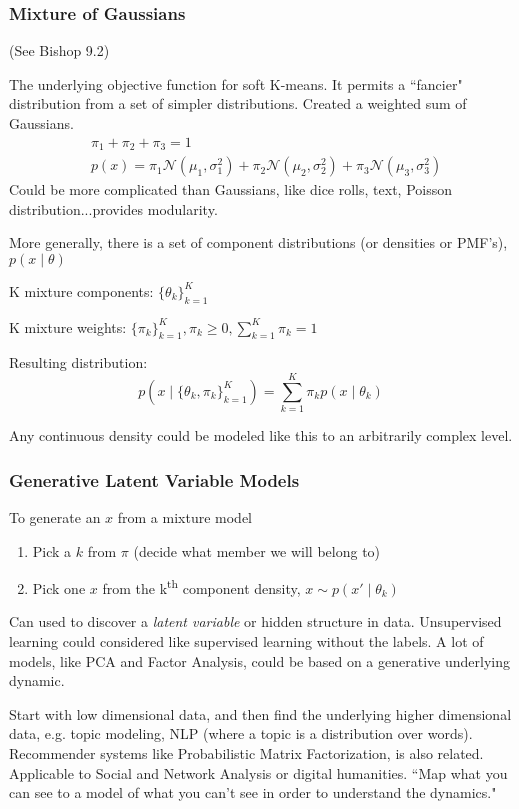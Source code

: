 \documentclass[11pt, oneside]{article}   	%
\begin{document}
\subsubsection{Mixture of Gaussians}

(See Bishop 9.2)

The underlying objective function for soft K-means. It permits a ``fancier" distribution from a set of simpler distributions. Created a weighted sum of Gaussians.
\begin{align}
&\pi_1 + \pi_2 + \pi_3 = 1\\
&p(x) = \pi_1 \mathcal{N}(\mu_1,\sigma_1^2) + \pi_2 \mathcal{N}(\mu_2,\sigma_2^2) + \pi_3 \mathcal{N}(\mu_3,\sigma_3^2)
\end{align}
Could be more complicated than Gaussians, like dice rolls, text, Poisson distribution...provides modularity.

More generally, there is a set of component distributions (or densities or PMF's),  \mbox{$p(x \mid \theta)$}

K mixture components: $\{ \theta_k \}_{k=1}^K$

K mixture weights: $\{ \pi_k \}_{k=1}^K, \pi_k \ge 0, \sum_{k=1}^K \pi_k = 1$

Resulting distribution:
\[
p(x \mid \{\theta_k, \pi_k\}_{k=1}^K) = \sum_{k=1}^K \pi_k p(x \mid \theta_k)
\]

Any continuous density could be modeled like this to an arbitrarily complex level.

\subsubsection{Generative Latent Variable Models}

To generate an $x$ from a mixture model
\begin{enumerate}
	\item Pick a $k$ from $\pi$ (decide what member we will belong to)
	\item Pick one $x$ from the k\textsuperscript{th} component density, $x \sim p(x' \mid \theta_k)$
\end{enumerate}

Can used to discover a \emph{latent variable}  or hidden structure in data. Unsupervised learning could considered like supervised learning without the labels. A lot of models, like PCA and Factor Analysis, could be based on a generative underlying dynamic. 

Start with low dimensional data, and then find the underlying higher dimensional data, e.g. topic modeling, NLP (where a topic is a distribution over words).  Recommender systems like Probabilistic Matrix Factorization, is also related. Applicable to Social and Network Analysis or digital humanities. ``Map what you can see to a model of what you can't see in order to understand the dynamics."
\end{document}
